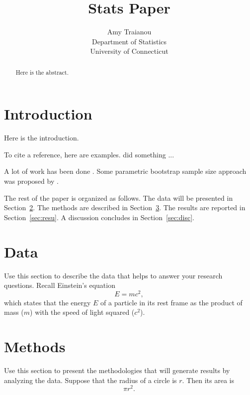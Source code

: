 \documentclass[12pt, titlepage]{article}
\title{Stats Paper}
\author{Amy Traianou\\
  Department of Statistics\\
  University of Connecticut
}
\begin{document}
\maketitle

\begin{abstract}
Here is the abstract.  
\end{abstract}


\section{Introduction}
\label{sec:intro}

Here is the introduction.

\lipsum[1-3]

To cite a reference, here are examples.
\citet{xie2015dynamic} did something ... \lipsum[1]

A lot of work has been done \citep[e.g.,][]{xie2015dynamic}.
\lipsum[2]
Some parametric bootstrap sample size approach was proposed by
\citet{dwivedi2017analysis}. 


The rest of the paper is organized as follows.
The data will be presented in Section~\ref{sec:data}.
The methods are described in Section~\ref{sec:meth}.
The results are reported in Section~\ref{sec:resu}.
A discussion concludes in Section~\ref{sec:disc}.


\section{Data}
\label{sec:data}

Use this section to describe the data that helps to answer your research
questions. Recall Einstein's equation
\begin{equation}
  \label{eq:mc2}
  E = m c^2,
\end{equation}
which states that the energy $E$ of a particle in its rest frame as the product
of mass ($m$) with the speed of light squared ($c^2$).

\section{Methods}
\label{sec:meth}

Use this section to present the methodologies that will generate results by
analyzing the data. Suppose that the radius of a circle is $r$. Then its area is
\begin{equation}
  \label{eq:area}
  \pi r^2.
\end{equation}
\end{document}
